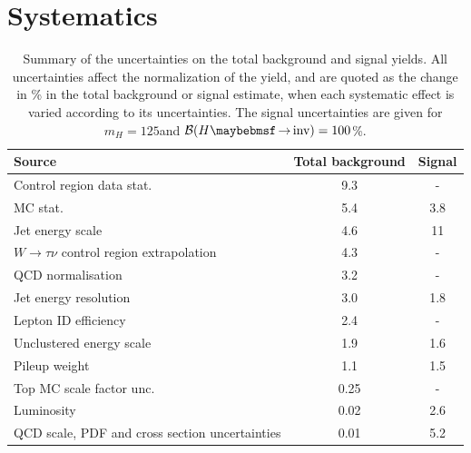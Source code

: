 \section{Systematics}


\begin{table}[!htb]
\centering
\begin{tabular}{|l|c|c|}
\hline 
Source                                            & Total background &     Signal \\
\hline\hline
Control region data stat.                          &            9.3  &          - \\
MC stat.                                           &            5.4  &        3.8 \\
Jet energy scale                                   &            4.6  &         11 \\
$W\rightarrow\tau\nu$ control region extrapolation &            4.3  &          - \\
QCD normalisation                                  &            3.2  &          - \\
Jet energy resolution                              &            3.0  &        1.8 \\
Lepton ID efficiency                               &            2.4  &          - \\
Unclustered energy scale                           &            1.9  &        1.6 \\
Pileup weight                                      &            1.1  &        1.5 \\
Top MC scale factor unc.                           &            0.25 &          - \\
Luminosity                                         &            0.02 &        2.6 \\
QCD scale, PDF and cross section uncertainties     &            0.01 &        5.2 \\
\hline
\end{tabular}
\caption{Summary of the uncertainties on the total background and signal yields. All uncertainties affect the normalization of the yield, and are quoted as the change in \% in the total background or signal estimate, when each systematic effect is varied according to its uncertainties. The signal uncertainties are given for $m_H=125$\GeV and $\BRinv=100$\%. \cite{ARTICLE:CMSVBFHiggsInvisibleParkedAnalysisPAS}}
\label{TABLE:ParkedDataAnalysis_Systematics_Summary}
\end{table}

